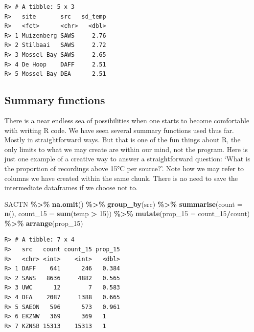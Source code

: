 \documentclass[
]{book}
\newenvironment{Shaded}{\begin{snugshade}}{\end{snugshade}}
\newcommand{\DataTypeTok}[1]{\textcolor[rgb]{0.13,0.29,0.53}{#1}}
\newcommand{\DecValTok}[1]{\textcolor[rgb]{0.00,0.00,0.81}{#1}}
\newcommand{\KeywordTok}[1]{\textcolor[rgb]{0.13,0.29,0.53}{\textbf{#1}}}
\newcommand{\NormalTok}[1]{#1}
\newcommand{\OperatorTok}[1]{\textcolor[rgb]{0.81,0.36,0.00}{\textbf{#1}}}
\newcommand{\StringTok}[1]{\textcolor[rgb]{0.31,0.60,0.02}{#1}}
\begin{document}
\begin{verbatim}
R> # A tibble: 5 x 3
R>   site       src   sd_temp
R>   <fct>      <chr>   <dbl>
R> 1 Muizenberg SAWS     2.76
R> 2 Stilbaai   SAWS     2.72
R> 3 Mossel Bay SAWS     2.65
R> 4 De Hoop    DAFF     2.51
R> 5 Mossel Bay DEA      2.51
\end{verbatim}

\hypertarget{summary-functions}{%
\subsection{Summary functions}\label{summary-functions}}

There is a near endless sea of possibilities when one starts to become comfortable with writing R code. We have seen several summary functions used thus far. Mostly in straightforward ways. But that is one of the fun things about R, the only limits to what we may create are within our mind, not the program. Here is just one example of a creative way to answer a straightforward question: `What is the proportion of recordings above 15°C per source?'. Note how we may refer to columns we have created within the same chunk. There is no need to save the intermediate dataframes if we choose not to.

\begin{Shaded}
\begin{Highlighting}[]
\NormalTok{SACTN }\OperatorTok{\%>\%}\StringTok{ }
\StringTok{  }\KeywordTok{na.omit}\NormalTok{() }\OperatorTok{\%>\%}\StringTok{ }
\StringTok{  }\KeywordTok{group\_by}\NormalTok{(src) }\OperatorTok{\%>\%}
\StringTok{  }\KeywordTok{summarise}\NormalTok{(}\DataTypeTok{count =} \KeywordTok{n}\NormalTok{(), }
            \DataTypeTok{count\_15 =} \KeywordTok{sum}\NormalTok{(temp }\OperatorTok{>}\StringTok{ }\DecValTok{15}\NormalTok{)) }\OperatorTok{\%>\%}\StringTok{ }
\StringTok{  }\KeywordTok{mutate}\NormalTok{(}\DataTypeTok{prop\_15 =}\NormalTok{ count\_}\DecValTok{15}\OperatorTok{/}\NormalTok{count) }\OperatorTok{\%>\%}\StringTok{ }
\StringTok{  }\KeywordTok{arrange}\NormalTok{(prop\_}\DecValTok{15}\NormalTok{)}
\end{Highlighting}
\end{Shaded}

\begin{verbatim}
R> # A tibble: 7 x 4
R>   src   count count_15 prop_15
R>   <chr> <int>    <int>   <dbl>
R> 1 DAFF    641      246   0.384
R> 2 SAWS   8636     4882   0.565
R> 3 UWC      12        7   0.583
R> 4 DEA    2087     1388   0.665
R> 5 SAEON   596      573   0.961
R> 6 EKZNW   369      369   1    
R> 7 KZNSB 15313    15313   1
\end{verbatim}
\end{document}

